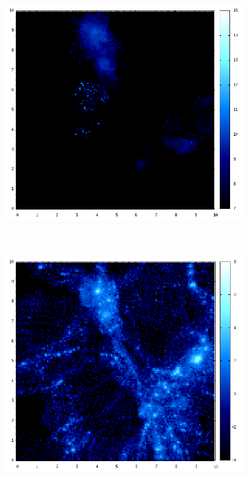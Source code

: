 \documentclass[journal]{IEEEtran}
\begin{document}
\begin{figure}[h!]
\begin{subfigure}[t]{0.25\textwidth}
	\end{subfigure}
	\quad
	\begin{subfigure}[t]{0.25\textwidth}
		\centering
		\includegraphics[width=\linewidth]{TEMP00-01.png}
	\end{subfigure}	
	\\
	\begin{subfigure}[t]{0.25\textwidth}
		\centering
		\includegraphics[width=\linewidth]{DM01-02.png}

\end{subfigure}
\end{figure}
\end{document}
